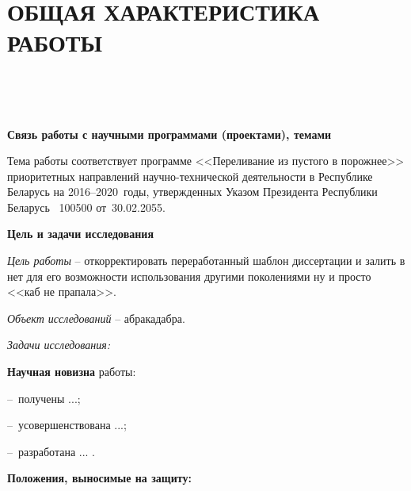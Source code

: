 
\chapter*{ОБЩАЯ ХАРАКТЕРИСТИКА РАБОТЫ} ~
~

\vspace{-16pt}
\textbf{Связь работы с научными программами (проектами), темами}

Тема работы соответствует программе <<Переливание из пустого в порожнее>> приоритетных направлений научно-технической деятельности в Республике Беларусь на \mbox{2016--2020}~годы, утвержденных Указом Президента Республики Беларусь  \textnumero ~100500 от~30.02.2055.


\textbf{Цель и задачи исследования}

\textit{Цель работы}
-- откорректировать переработанный шаблон диссертации и залить в нет для его возможности использования другими поколениями ну и просто <<каб не прапала>>.

\textit{Объект исследований} -- абракадабра.

\textit{Задачи исследования:}

%

%
\textbf{Научная новизна} работы:

--~получены ...;

--~усовершенствована ...;

--~разработана ... .



\textbf{Положения, выносимые на защиту:}

